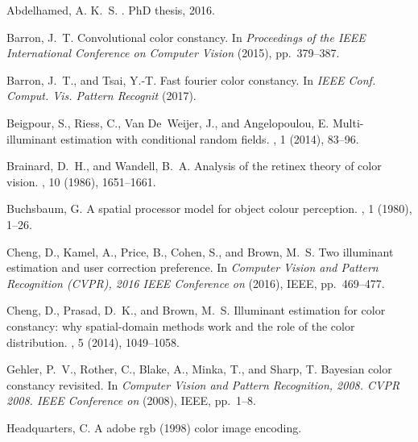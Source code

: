 \documentclass[sigplan]{acmart}
\begin{document}


\begin{thebibliography}{10}

{\sc Abdelhamed, A. K.~S.}
.
\newblock PhD thesis, 2016.

{\sc Barron, J.~T.}
\newblock Convolutional color constancy.
\newblock In {\em Proceedings of the IEEE International Conference on Computer
  Vision\/} (2015), pp.~379--387.

{\sc Barron, J.~T., and Tsai, Y.-T.}
\newblock Fast fourier color constancy.
\newblock In {\em IEEE Conf. Comput. Vis. Pattern Recognit\/} (2017).

{\sc Beigpour, S., Riess, C., Van De~Weijer, J., and Angelopoulou, E.}
\newblock Multi-illuminant estimation with conditional random fields.
, 1 (2014), 83--96.

{\sc Brainard, D.~H., and Wandell, B.~A.}
\newblock Analysis of the retinex theory of color vision.
, 10 (1986), 1651--1661.

{\sc Buchsbaum, G.}
\newblock A spatial processor model for object colour perception.
, 1 (1980), 1--26.

{\sc Cheng, D., Kamel, A., Price, B., Cohen, S., and Brown, M.~S.}
\newblock Two illuminant estimation and user correction preference.
\newblock In {\em Computer Vision and Pattern Recognition (CVPR), 2016 IEEE
  Conference on\/} (2016), IEEE, pp.~469--477.

{\sc Cheng, D., Prasad, D.~K., and Brown, M.~S.}
\newblock Illuminant estimation for color constancy: why spatial-domain methods
  work and the role of the color distribution.
, 5 (2014), 1049--1058.

{\sc Gehler, P.~V., Rother, C., Blake, A., Minka, T., and Sharp, T.}
\newblock Bayesian color constancy revisited.
\newblock In {\em Computer Vision and Pattern Recognition, 2008. CVPR 2008.
  IEEE Conference on\/} (2008), IEEE, pp.~1--8.

{\sc Headquarters, C.}
\newblock A adobe{\textregistered} rgb (1998) color image encoding.


\end{thebibliography}
\end{document}

